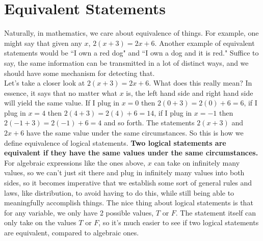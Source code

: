 \section{Equivalent Statements}\label{Section:EquivalentStatements}


Naturally, in mathematics, we care about equivalence of things.  For example, one might say that given any $x$, $2(x+3)=2x+6$.  Another example of equivalent statements would be ``I own a red dog" and ``I own a dog and it is red."  Suffice to say, the same information can be transmitted in a lot of distinct ways, and we should have some mechanism for detecting that.\\

Let's take a closer look at $2(x+3)=2x+6$.  What does this really mean?  In essence, it says that no matter what $x$ is, the left hand side and right hand side will yield the same value.  If I plug in $x=0$ then $2(0+3)=2(0)+6=6$, if I plug in $x=4$ then $2(4+3)=2(4)+6=14$, if I plug in $x=-1$ then $2(-1+3)=2(-1)+6=4$ and so forth.  The statements $2(x+3)$ and $2x+6$ have the same value under the same circumstances.  So this is how we define equivalence of logical statements. \textbf{Two logical statements are equivalent if they have the same values under the same circumstances.}\\

For algebraic expressions like the ones above, $x$ can take on infinitely many values, so we can't just sit there and plug in infinitely many values into both sides, so it becomes imperative that we establish some sort of general rules and laws, like distribution, to avoid having to do this, while still being able to meaningfully accomplish things.  The nice thing about logical statements is that for any variable, we only have 2 possible values, $T$ or $F$.  The statement itself can only take on the values $T$ or $F$, so it's much easier to see if two logical statements are equivalent, compared to algebraic ones.\\

